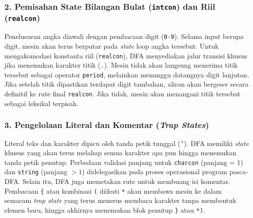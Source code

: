\documentclass[12pt,a4paper]{article}
\begin{document}
\subsubsection*{2. Pemisahan State Bilangan Bulat (\texttt{intcon}) dan Riil (\texttt{realcon})}
Penelusuran angka diawali dengan pembacaan digit (\texttt{0-9}). Selama input berupa digit, mesin akan terus berputar pada \textit{state} loop angka tersebut. Untuk mengakomodasi konstanta riil (\texttt{realcon}), DFA menyediakan jalur transisi khusus jika menemukan karakter titik (\texttt{.}). Mesin tidak akan langsung menerima titik tersebut sebagai operator \texttt{period}, melainkan menunggu datangnya digit lanjutan. Jika setelah titik dipastikan terdapat digit tambahan, aliran akan bergeser secara definitif ke rute final \texttt{realcon}. Jika tidak, mesin akan menangani titik tersebut sebagai leksikal terpisah.

\subsubsection*{3. Pengelolaan Literal dan Komentar (\textit{Trap States})}
Literal teks dan karakter dipicu oleh tanda petik tunggal (\texttt{'}). DFA memiliki \textit{state} khusus yang akan terus melahap semua karakter apa pun hingga menemukan tanda petik penutup. Perbedaan validasi panjang untuk \texttt{charcon} (panjang = 1) dan \texttt{string} (panjang $> 1$) didelegasikan pada proses operasional program pasca-DFA.
Selain itu, DFA juga memetakan rute untuk membuang isi komentar. Pembacaan \texttt{\{} atau kombinasi \texttt{(} diikuti \texttt{*} akan membawa mesin ke dalam semacam \textit{trap state} yang terus menerus membaca karakter tanpa membentuk elemen baru, hingga akhirnya menemukan blok penutup \texttt{\}} atau \texttt{*)}.
\end{document}

